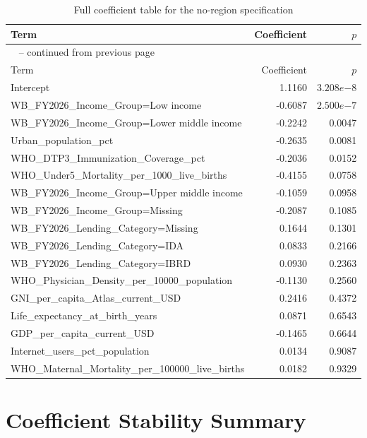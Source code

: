 \documentclass[runningheads]{llncs}
\begin{document}
{\begin{longtable}{p{}r@{\hspace{1.5em}}r}
\caption{Full coefficient table for the no-region specification}\label{tab:appendix-coefficients-no-region}\\
\hline
Term & Coefficient & $p$ \\
\hline
\endfirsthead
\multicolumn{3}{l}{\tablename\ \thetable{} -- continued from previous page}\\
\hline
Term & Coefficient & $p$ \\
\hline
\endhead
Intercept & 1.1160 & $3.208e{-8}$ \\
WB\_FY2026\_Income\_Group=Low income & -0.6087 & $2.500e{-7}$ \\
WB\_FY2026\_Income\_Group=Lower middle income & -0.2242 & 0.0047 \\
Urban\_population\_pct & -0.2635 & 0.0081 \\
WHO\_DTP3\_Immunization\_Coverage\_pct & -0.2036 & 0.0152 \\
WHO\_Under5\_Mortality\_per\_1000\_live\_births & -0.4155 & 0.0758 \\
WB\_FY2026\_Income\_Group=Upper middle income & -0.1059 & 0.0958 \\
WB\_FY2026\_Income\_Group=Missing & -0.2087 & 0.1085 \\
WB\_FY2026\_Lending\_Category=Missing & 0.1644 & 0.1301 \\
WB\_FY2026\_Lending\_Category=IDA & 0.0833 & 0.2166 \\
WB\_FY2026\_Lending\_Category=IBRD & 0.0930 & 0.2363 \\
WHO\_Physician\_Density\_per\_10000\_population & -0.1130 & 0.2560 \\
GNI\_per\_capita\_Atlas\_current\_USD & 0.2416 & 0.4372 \\
Life\_expectancy\_at\_birth\_years & 0.0871 & 0.6543 \\
GDP\_per\_capita\_current\_USD & -0.1465 & 0.6644 \\
Internet\_users\_pct\_population & 0.0134 & 0.9087 \\
WHO\_Maternal\_Mortality\_per\_100000\_live\_births & 0.0182 & 0.9329 \\
\hline
\end{longtable}
}

\section{Coefficient Stability Summary}
\end{document}

